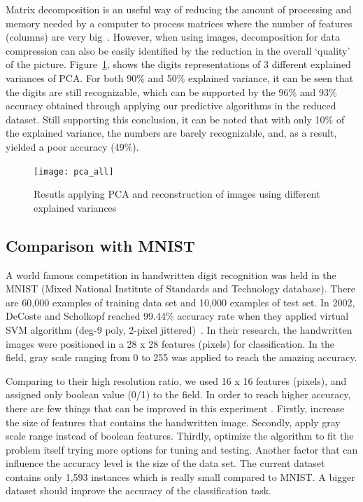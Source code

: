 \documentclass[letterpaper,10pt]{article}
\theoremstyle{mytheor}
\begin{document}
Matrix decomposition is an useful way of reducing the amount of processing and memory needed by a computer to process matrices where the number of features (columns) are very big~\cite{rajaraman2012mining}. However, when using images, decomposition for data compression can also be easily identified by the reduction in the overall ‘quality’ of the picture. Figure~\ref{fig:3}, shows the digits representations of 3 different explained variances of PCA. For both 90\% and 50\% explained variance, it can be seen that the digits are still recognizable, which can be supported by the 96\% and 93\% accuracy obtained through applying our predictive algorithms in the reduced dataset. Still supporting this conclusion, it can be noted that with only 10\% of the explained variance, the numbers are barely recognizable, and, as a result, yielded a poor accuracy (49\%).

\begin{figure}[H]
\texttt{[image: pca\_all]}
\centering
\caption{Resutls applying PCA and reconstruction of images using different  explained variances}
\label{fig:3}
\end{figure}



\subsection{Comparison with MNIST}

A world famous competition in handwritten digit recognition was held in the MNIST (Mixed National Institute of Standards and Technology database). There are 60,000 examples of training data set and 10,000 examples of test set. In 2002, DeCoste and Scholkopf reached 99.44\% accuracy rate when they applied virtual SVM algorithm (deg-9 poly, 2-pixel jittered)~\cite{decoste2002training}. In their research, the handwritten images were positioned in a 28 x 28 features (pixels) for classification. In the field, gray scale ranging from 0 to 255 was applied to reach the amazing accuracy.

Comparing to their high resolution ratio, we used 16 x 16 features (pixels), and assigned only boolean value (0/1) to the field. In order to reach higher accuracy, there are few things that can be improved in this experiment . Firstly, increase the size of features that contains the handwritten image. Secondly, apply gray scale range instead of boolean features. Thirdly, optimize the algorithm to fit the problem itself trying more options for tuning and testing. Another factor that can influence the accuracy level is the size of the data set. The current dataset contains only 1,593 instances which is really small compared to MNIST. A bigger dataset should improve the accuracy of the classification task.
\end{document}
